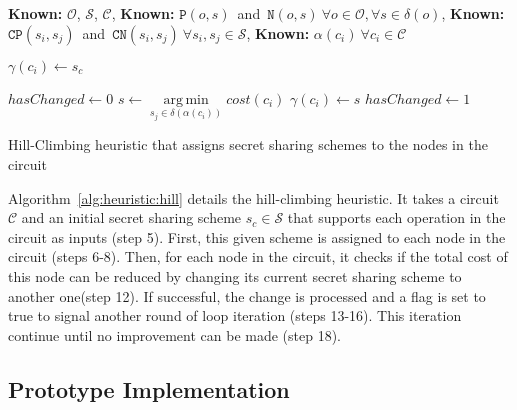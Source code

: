 \documentclass{llncs}
\DeclareMathOperator*{\argmin}{arg\,min}
\begin{document}
\vspace{-0.6cm}
\begin{algorithm}[hbt]
\footnotesize
	\begin{algorithmic}[1]
		\State \textbf{Known:} $\mathcal{O}$, $\mathcal{S}$, $\mathcal{C}$, 
		\State \textbf{Known:} $\mathtt{P}(o, s)$~and~$\mathtt{N}(o,s)~\forall o \in \mathcal{O}, \forall s \in \delta(o)$, 
		\State \textbf{Known:} $\mathtt{CP}(s_i, s_j)$~and~$\mathtt{CN}(s_i, s_j) ~ \forall s_i, s_j \in \mathcal{S}$, 
		\State \textbf{Known:} $\alpha(c_i)~\forall c_i \in \mathcal{C}$

			\State $\gamma(c_i) \gets s_c$ 
		\EndFor

		\Repeat
			\State $hasChanged \gets 0$
				\State $s \gets \argmin\limits_{s_j \in \delta(\alpha(c_i))} cost(c_i)$
					\State $\gamma(c_i) \gets s$
					\State $hasChanged \gets 1$
				\EndIf
			\EndFor
		\EndFunction
	\end{algorithmic}
	
	\caption{Hill-Climbing heuristic that assigns secret sharing schemes to the nodes in the circuit}
	\label{alg:heuristic:hill}
\end{algorithm}

\vspace{-0.45cm}
Algorithm~\ref{alg:heuristic:hill} details the hill-climbing heuristic. It takes a circuit $\mathcal{C}$ and an initial secret sharing scheme $s_c \in \mathcal{S}$ that supports each operation in the circuit as inputs (step 5). First, this given scheme is assigned to each node in the circuit (steps 6-8). Then, for each node in the circuit, it checks if the total cost of this node can be reduced by changing its current secret sharing scheme to another one(step 12). If successful, the change is processed and a flag is set to true to signal another round of loop iteration (steps 13-16). This iteration continue until no improvement can be made (step 18).

\subsection{Prototype Implementation}
\label{sec:system:proto}
\end{document}
